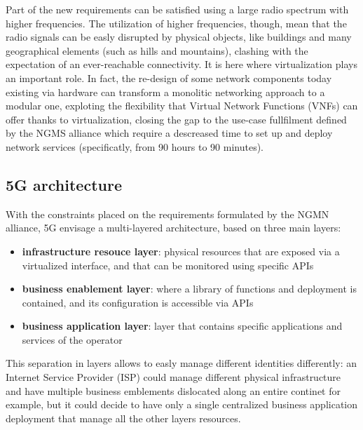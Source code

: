 Part of the new requirements can be satisfied using a large radio spectrum with
higher frequencies. The utilization of higher frequencies, though, mean that the
radio signals can be easly disrupted by physical objects, like buildings and
many geographical elements (such as hills and mountains), clashing with the
expectation of an ever-reachable connectivity. It is here where virtualization
plays an important role. In fact, the re-design of some network components today
existing via hardware can transform a monolitic networking approach to a modular
one, exploting the flexibility that Virtual Network Functions (VNFs) can
offer thanks to virtualization, closing the gap to the use-case fullfilment
defined by the NGMS alliance which 
require a descreased time to set up and deploy network services (specificatly, 
from 90 hours to 90 minutes).

\subsection{5G architecture}

With the constraints placed on the requirements formulated by the NGMN alliance,
5G envisage a multi-layered architecture, based on three main layers:
\begin{itemize}
\item \textbf{infrastructure resouce layer}: physical resources that are exposed
  via a virtualized interface, and that can be monitored using specific APIs
\item \textbf{business enablement layer}: where a library of functions and
  deployment is contained, and its configuration is accessible via APIs
\item \textbf{business application layer}: layer that contains specific
  applications and services of the operator
\end{itemize}


This separation in layers allows to easly manage different identities 
differently: an Internet Service Provider (ISP) could manage different physical
infrastructure and have multiple business emblements dislocated 
along an entire continet for example, but it could decide to have only a single 
centralized business application deployment that manage all the other layers 
resources.

